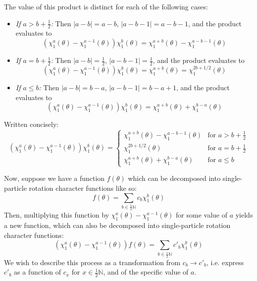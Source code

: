 \documentclass[12pt]{article}
\begin{document}
	The value of this product is distinct for each of the following cases:
	\begin{itemize}
	\item \textit{If $a>b+\frac{1}{2}$:} Then $|a-b|=a-b$, $|a-b-1|=a-b-1$, and the product evaluates to
	\begin{equation*}
	\left(\chi^a_1(\theta)-\chi^{a-1}_1(\theta)\right)\chi^b_1(\theta) = \chi^{a+b}_1(\theta) - \chi^{a-b-1}_1(\theta)
	\end{equation*}
	\item \textit{If $a=b+\frac{1}{2}$:} Then $|a-b|=\frac{1}{2}$, $|a-b-1|=\frac{1}{2}$, and the product evaluates to
	\begin{equation*}
	\left(\chi^a_1(\theta)-\chi^{a-1}_1(\theta)\right)\chi^b_1(\theta) = \chi^{a+b}_1(\theta) = \chi^{2b+1/2}_1(\theta)
	\end{equation*}
	\item \textit{If $a \leq b$:} Then $|a-b| = b-a$, $|a-b-1|=b-a+1$, and the product evaluates to
	\begin{equation*}
	\left(\chi^a_1(\theta)-\chi^{a-1}_1(\theta)\right)\chi^b_1(\theta) = \chi^{a+b}_1(\theta) + \chi^{b-a}_1(\theta)
	\end{equation*}
	\end{itemize}
	Written concisely:
	\begin{equation} \label{kernel_contraction_transformation_of_single_particle}
	\left(\chi^a_1(\theta)-\chi^{a-1}_1(\theta)\right)\chi^b_1(\theta) = \begin{cases}
	\chi^{a+b}_1(\theta) - \chi^{a-b-1}_1(\theta) & \text{for }a>b+\frac{1}{2}\\
	\chi^{2b+1/2}_1(\theta) & \text{for }a=b+\frac{1}{2}\\
	\chi^{a+b}_1(\theta) + \chi^{b-a}_1(\theta) & \text{for }a \leq b
	\end{cases}	
	\end{equation}
	
	Now, suppose we have a function $f(\theta)$ which can be decomposed into single-particle rotation character functions like so:
	\begin{equation} \label{original_decomposition}
	f(\theta) = \sum_{b\in\frac{1}{2}\mathbb{N}}c_b \chi^b_1(\theta)
	\end{equation}
	Then, multiplying this function by $\chi^a_1(\theta)-\chi^{a-1}_1(\theta)$ for some value of $a$ yields a new function, which can also be decomposed into single-particle rotation character functions:
	\begin{equation}
	\left(\chi^a_1(\theta)-\chi^{a-1}_1(\theta)\right)f(\theta) = \sum_{b\in\frac{1}{2}\mathbb{N}}c'_b \chi^b_1(\theta)
	\end{equation}
	We wish to describe this process as a transformation from $c_b\to c'_b$, i.e. express $c'_b$ as a function of $c_x$ for $x\in\frac{1}{2}\mathbb{N}$, and of the specific value of $a$.
	
\end{document}
